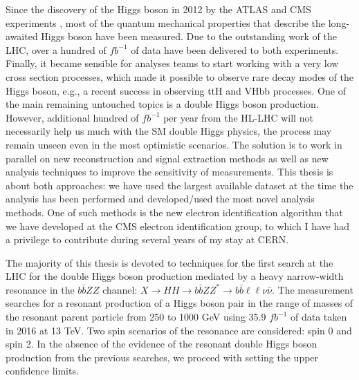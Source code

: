 Since the discovery of the Higgs boson in 2012 by the ATLAS and CMS experiments%
, most of the quantum mechanical properties that describe the long-awaited Higgs boson have been measured. Due to the outstanding work of the LHC, over a hundred of $fb^{-1}$ of data have been delivered to both experiments. Finally, it became sensible for analyses teams to start working with a very low cross section processes, which made it possible to observe rare decay modes of the Higgs boson, e.g., a recent success in observing ttH and VHbb processes. One of the main remaining untouched topics is a double Higgs boson production. However, additional hundred of $fb^{-1}$ per year from the HL-LHC will not necessarily help us much with the SM double Higgs physics, the process may remain unseen even in the most optimistic scenarios. The solution is to work in parallel on new reconstruction and signal extraction methods as well as new analysis techniques to improve the sensitivity of measurements. This thesis is about both approaches: we have used the largest available dataset at the time the analysis has been performed and developed/used the most novel analysis methods. One of such methods is the new electron identification algorithm that we have developed at the CMS electron identification group, to which I have had a privilege to contribute during several years of my stay at CERN.

The majority of this thesis is devoted to techniques for the first search at the LHC for the double Higgs boson production mediated by a heavy narrow-width resonance in the $b\bar{b}ZZ$ channel:  $X \to HH \to b\bar{b}ZZ^{*} \to b\bar{b} \ell\ell\nu \bar{\nu}$. The measurement searches for a resonant production of a Higgs boson pair in the range of masses of the resonant parent particle from 250 to 1000 GeV using 35.9 $fb^{-1}$ of data taken in 2016 at 13 TeV. Two spin scenarios of the resonance are considered: spin 0 and spin 2. In the absence of the evidence of the resonant double Higgs boson production from the previous searches, we proceed with setting the upper confidence limits. %
